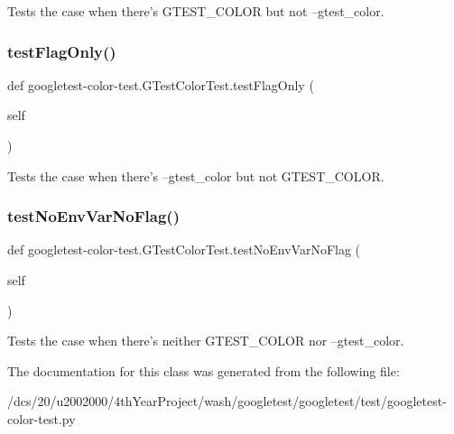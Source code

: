 \begin{DoxyVerb}Tests the case when there's GTEST_COLOR but not --gtest_color.\end{DoxyVerb}
 \mbox{\label{classgoogletest-color-test_1_1GTestColorTest_ade41e99b5486c9d947d9b817210174f6}} 
\subsubsection{\texorpdfstring{test\+Flag\+Only()}{testFlagOnly()}}
{\footnotesize\ttfamily def googletest-\/color-\/test.\+G\+Test\+Color\+Test.\+test\+Flag\+Only (\begin{DoxyParamCaption}\item[{}]{self }\end{DoxyParamCaption})}

\begin{DoxyVerb}Tests the case when there's --gtest_color but not GTEST_COLOR.\end{DoxyVerb}
 \mbox{\label{classgoogletest-color-test_1_1GTestColorTest_ae36014618c6afc19fa6d77babf8faa88}} 
\subsubsection{\texorpdfstring{test\+No\+Env\+Var\+No\+Flag()}{testNoEnvVarNoFlag()}}
{\footnotesize\ttfamily def googletest-\/color-\/test.\+G\+Test\+Color\+Test.\+test\+No\+Env\+Var\+No\+Flag (\begin{DoxyParamCaption}\item[{}]{self }\end{DoxyParamCaption})}

\begin{DoxyVerb}Tests the case when there's neither GTEST_COLOR nor --gtest_color.\end{DoxyVerb}
 

The documentation for this class was generated from the following file\+:\begin{DoxyCompactItemize}
\item 
/dcs/20/u2002000/4th\+Year\+Project/wash/googletest/googletest/test/googletest-\/color-\/test.\+py\end{DoxyCompactItemize}

